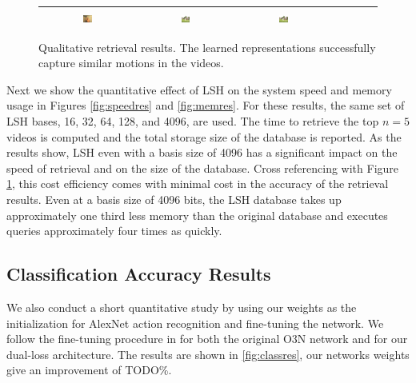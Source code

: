 \begin{figure}[t]
\begin{center}
\begin{tabular}{|c|c|ccccc|}
          \includegraphics[width=0.1\textwidth]{images/ret_results/writing/64.png} & 
          \includegraphics[width=0.1\textwidth]{images/ret_results/writing/128.png} & 
          \includegraphics[width=0.1\textwidth]{images/ret_results/writing/4096.png} \\ \hline            
        \end{tabular}
        \caption{Qualitative retrieval results. The learned representations successfully capture similar motions in the videos.}
        \label{fig:retres}
    \end{center}
\end{figure}

Next we show the quantitative effect of LSH on the system speed and memory usage in Figures \ref{fig:speedres} and \ref{fig:memres}. For these results, the same set of LSH bases, 16, 32, 64, 128, and 4096, are used. The time to retrieve the top $n=5$ videos is computed and the total storage size of the database is reported. As the results show, LSH even with a basis size of 4096 has a significant impact on the speed of retrieval and on the size of the database. Cross referencing with Figure \ref{fig:retres}, this cost efficiency comes with minimal cost in the accuracy of the retrieval results. Even at a basis size of 4096 bits, the LSH database takes up approximately one third less memory than the original database and executes queries approximately four times as quickly.

\subsection{Classification Accuracy Results}

We also conduct a short quantitative study by using our weights as the initialization for AlexNet action recognition and fine-tuning the network. We follow the fine-tuning procedure in \cite{fernando2017self} for both the original O3N network and for our dual-loss architecture. The results are shown in \ref{fig:classres}, our networks weights give an improvement of TODO\%.

